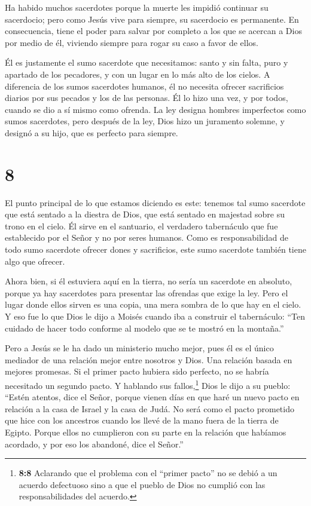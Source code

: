  Ha habido muchos sacerdotes porque la muerte les impidió
continuar su sacerdocio;  pero como Jesús vive para
siempre, su sacerdocio es permanente.  En consecuencia,
tiene el poder para salvar por completo a los que se acercan a Dios por
medio de él, viviendo siempre para rogar su caso a favor de ellos.

 Él es justamente el sumo sacerdote que necesitamos: santo
y sin falta, puro y apartado de los pecadores, y con un lugar en lo más
alto de los cielos.  A diferencia de los sumos sacerdotes
humanos, él no necesita ofrecer sacrificios diarios por sus pecados y
los de las personas. Él lo hizo una vez, y por todos, cuando se dio a sí
mismo como ofrenda.  La ley designa hombres imperfectos
como sumos sacerdotes, pero después de la ley, Dios hizo un juramento
solemne, y designó a su hijo, que es perfecto para siempre.

\hypertarget{section-7}{%
\section{8}\label{section-7}}

 El punto principal de lo que estamos diciendo es este:
tenemos tal sumo sacerdote que está sentado a la diestra de Dios, que
está sentado en majestad sobre su trono en el cielo.  Él
sirve en el santuario, el verdadero tabernáculo que fue establecido por
el Señor y no por seres humanos.  Como es responsabilidad de
todo sumo sacerdote ofrecer dones y sacrificios, este sumo sacerdote
también tiene algo que ofrecer.

 Ahora bien, si él estuviera aquí en la tierra, no sería un
sacerdote en absoluto, porque ya hay sacerdotes para presentar las
ofrendas que exige la ley.  Pero el lugar donde ellos sirven
es una copia, una mera sombra de lo que hay en el cielo. Y eso fue lo
que Dios le dijo a Moisés cuando iba a construir el tabernáculo: ``Ten
cuidado de hacer todo conforme al modelo que se te mostró en la
montaña.''

 Pero a Jesús se le ha dado un ministerio mucho mejor, pues
él es el único mediador de una relación mejor entre nosotros y Dios. Una
relación basada en mejores promesas.  Si el primer pacto
hubiera sido perfecto, no se habría necesitado un segundo pacto.
 Y hablando sus fallos,\footnote{\textbf{8:8} Aclarando que
  el problema con el ``primer pacto'' no se debió a un acuerdo
  defectuoso sino a que el pueblo de Dios no cumplió con las
  responsabilidades del acuerdo.} Dios le dijo a su pueblo: ``Estén
atentos, dice el Señor, porque vienen días en que haré un nuevo pacto en
relación a la casa de Israel y la casa de Judá.  No será
como el pacto prometido que hice con los ancestros cuando los llevé de
la mano fuera de la tierra de Egipto. Porque ellos no cumplieron con su
parte en la relación que habíamos acordado, y por eso los abandoné, dice
el Señor.''


